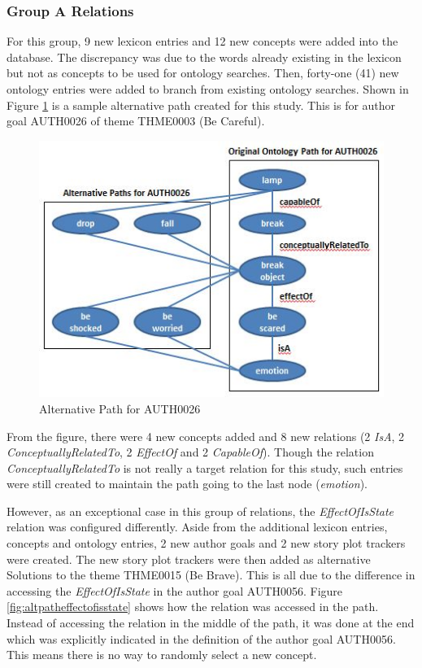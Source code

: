 \subsubsection*{Group A Relations}

For this group, 9 new lexicon entries and 12 new concepts were added into the database. The discrepancy was due to the words already existing in the lexicon but not as concepts to be used for ontology searches. Then, forty-one (41) new ontology entries were added to branch from existing ontology searches. Shown in Figure \ref{fig:altpath} is a sample alternative path created for this study. This is for author goal AUTH0026 of theme THME0003 (Be Careful).

\begin{figure}[h]                %
   \centering                    %
   \includegraphics{altpath.jpg}      %
   \caption{Alternative Path for AUTH0026}
    \label{fig:altpath}
\end{figure}

From the figure, there were 4 new concepts added and 8 new relations (2 \textit{IsA}, 2 \textit{ConceptuallyRelatedTo}, 2 \textit{EffectOf} and 2  \textit{CapableOf}). Though the relation \textit{ConceptuallyRelatedTo} is not really a target relation for this study, such entries were still created to maintain the path going to the last node (\textit{emotion}). 

However, as an exceptional case in this group of relations, the \textit{EffectOfIsState} relation was configured differently. Aside from the additional lexicon entries, concepts and ontology entries, 2 new author goals and 2 new story plot trackers were created. The new story plot trackers were then added as alternative Solutions to the theme THME0015 (Be Brave). This is all due to the difference in accessing the \textit{EffectOfIsState} in the author goal AUTH0056. Figure \ref{fig:altpatheffectofisstate} shows how the relation was accessed in the path. Instead of accessing the relation in the middle of the path, it was done at the end which was explicitly indicated in the definition of the author goal AUTH0056. This means there is no way to randomly select a new concept. 

